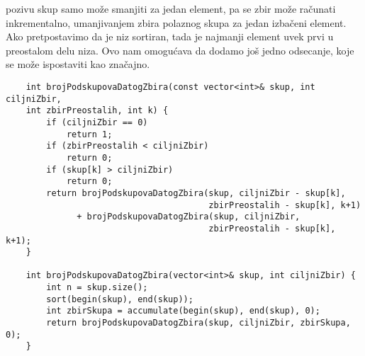 \documentclass{article}
\begin{document}
pozivu skup samo može smanjiti za jedan element, pa se zbir može računati
inkrementalno, umanjivanjem zbira polaznog skupa za jedan izbačeni element.
Ako pretpostavimo da je niz sortiran, tada je najmanji
element uvek prvi u preostalom delu niza. Ovo nam omogućava da dodamo još
jedno odsecanje, koje se može ispostaviti kao značajno.
\begin{lstlisting}
    int brojPodskupovaDatogZbira(const vector<int>& skup, int ciljniZbir,
    int zbirPreostalih, int k) {
        if (ciljniZbir == 0)
            return 1;
        if (zbirPreostalih < ciljniZbir)
            return 0;
        if (skup[k] > ciljniZbir)
            return 0;
        return brojPodskupovaDatogZbira(skup, ciljniZbir - skup[k],  
                                        zbirPreostalih - skup[k], k+1)
              + brojPodskupovaDatogZbira(skup, ciljniZbir, 
                                        zbirPreostalih - skup[k], k+1);
    }
    
    int brojPodskupovaDatogZbira(vector<int>& skup, int ciljniZbir) {
        int n = skup.size();
        sort(begin(skup), end(skup));
        int zbirSkupa = accumulate(begin(skup), end(skup), 0);
        return brojPodskupovaDatogZbira(skup, ciljniZbir, zbirSkupa, 0);
    }
\end{lstlisting}
\end{document}
